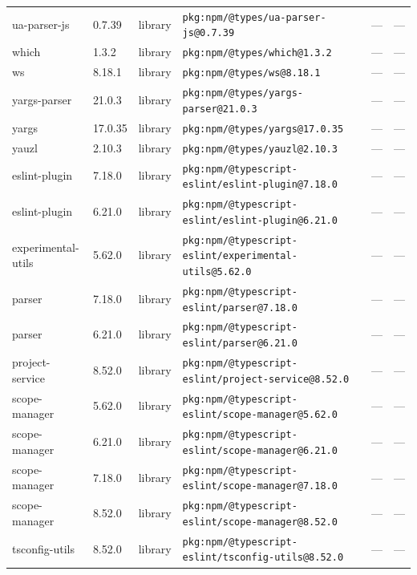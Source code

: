 \documentclass[11pt,a4paper]{article}
\begin{document}
\begin{longtable}{|p{4cm}|p{2cm}|p{1.6cm}|p{5cm}|p{1.5cm}|p{3.5cm}|}
\raggedright ua-parser-js & 0.7.39 & library & \small\texttt{pkg:npm/@types/ua-parser-js@0.7.39} & — & \small — \\
\raggedright which & 1.3.2 & library & \small\texttt{pkg:npm/@types/which@1.3.2} & — & \small — \\
\raggedright ws & 8.18.1 & library & \small\texttt{pkg:npm/@types/ws@8.18.1} & — & \small — \\
\raggedright yargs-parser & 21.0.3 & library & \small\texttt{pkg:npm/@types/yargs-parser@21.0.3} & — & \small — \\
\raggedright yargs & 17.0.35 & library & \small\texttt{pkg:npm/@types/yargs@17.0.35} & — & \small — \\
\raggedright yauzl & 2.10.3 & library & \small\texttt{pkg:npm/@types/yauzl@2.10.3} & — & \small — \\
\raggedright eslint-plugin & 7.18.0 & library & \small\texttt{pkg:npm/@typescript-eslint/eslint-plugin@7.18.0} & — & \small — \\
\raggedright eslint-plugin & 6.21.0 & library & \small\texttt{pkg:npm/@typescript-eslint/eslint-plugin@6.21.0} & — & \small — \\
\raggedright experimental-utils & 5.62.0 & library & \small\texttt{pkg:npm/@typescript-eslint/experimental-utils@5.62.0} & — & \small — \\
\raggedright parser & 7.18.0 & library & \small\texttt{pkg:npm/@typescript-eslint/parser@7.18.0} & — & \small — \\
\raggedright parser & 6.21.0 & library & \small\texttt{pkg:npm/@typescript-eslint/parser@6.21.0} & — & \small — \\
\raggedright project-service & 8.52.0 & library & \small\texttt{pkg:npm/@typescript-eslint/project-service@8.52.0} & — & \small — \\
\raggedright scope-manager & 5.62.0 & library & \small\texttt{pkg:npm/@typescript-eslint/scope-manager@5.62.0} & — & \small — \\
\raggedright scope-manager & 6.21.0 & library & \small\texttt{pkg:npm/@typescript-eslint/scope-manager@6.21.0} & — & \small — \\
\raggedright scope-manager & 7.18.0 & library & \small\texttt{pkg:npm/@typescript-eslint/scope-manager@7.18.0} & — & \small — \\
\raggedright scope-manager & 8.52.0 & library & \small\texttt{pkg:npm/@typescript-eslint/scope-manager@8.52.0} & — & \small — \\
\raggedright tsconfig-utils & 8.52.0 & library & \small\texttt{pkg:npm/@typescript-eslint/tsconfig-utils@8.52.0} & — & \small — \\

\end{longtable}
\end{document}

